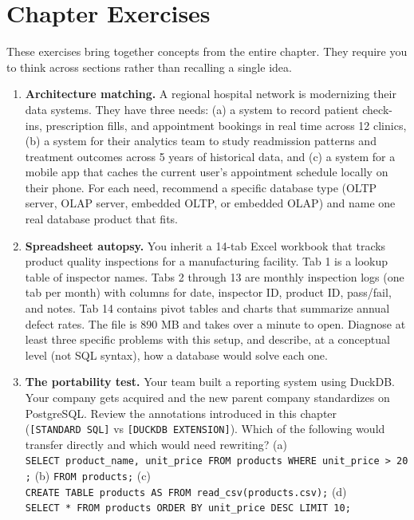 \documentclass[
  letterpaper,
  DIV=11,
  numbers=noendperiod]{scrreprt}
\begin{document}
\section{Chapter Exercises}\label{chapter-exercises}

These exercises bring together concepts from the entire chapter. They
require you to think across sections rather than recalling a single
idea.

\begin{enumerate}
\def\labelenumi{\arabic{enumi}.}
\item
  \textbf{Architecture matching.} A regional hospital network is
  modernizing their data systems. They have three needs: (a) a system to
  record patient check-ins, prescription fills, and appointment bookings
  in real time across 12 clinics, (b) a system for their analytics team
  to study readmission patterns and treatment outcomes across 5 years of
  historical data, and (c) a system for a mobile app that caches the
  current user's appointment schedule locally on their phone. For each
  need, recommend a specific database type (OLTP server, OLAP server,
  embedded OLTP, or embedded OLAP) and name one real database product
  that fits.
\item
  \textbf{Spreadsheet autopsy.} You inherit a 14-tab Excel workbook that
  tracks product quality inspections for a manufacturing facility. Tab 1
  is a lookup table of inspector names. Tabs 2 through 13 are monthly
  inspection logs (one tab per month) with columns for date, inspector
  ID, product ID, pass/fail, and notes. Tab 14 contains pivot tables and
  charts that summarize annual defect rates. The file is 890 MB and
  takes over a minute to open. Diagnose at least three specific problems
  with this setup, and describe, at a conceptual level (not SQL syntax),
  how a database would solve each one.
\item
  \textbf{The portability test.} Your team built a reporting system
  using DuckDB. Your company gets acquired and the new parent company
  standardizes on PostgreSQL. Review the annotations introduced in this
  chapter (\texttt{{[}STANDARD\ SQL{]}} vs
  \texttt{{[}DUCKDB\ EXTENSION{]}}). Which of the following would
  transfer directly and which would need rewriting? (a)
  \texttt{SELECT\ product\_name,\ unit\_price\ FROM\ products\ WHERE\ unit\_price\ \textgreater{}\ 20;}
  (b) \texttt{FROM\ products;} (c)
  \texttt{CREATE\ TABLE\ products\ AS\ FROM\ read\_csv(\textquotesingle{}products.csv\textquotesingle{});}
  (d)
  \texttt{SELECT\ *\ FROM\ products\ ORDER\ BY\ unit\_price\ DESC\ LIMIT\ 10;}

\end{enumerate}
\end{document}
